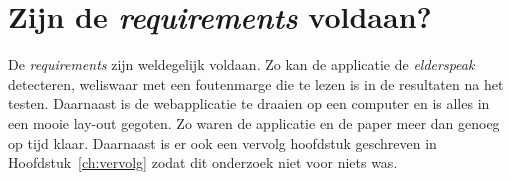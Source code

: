 \section{Zijn de \textit{requirements} voldaan?}
De \textit{requirements} zijn weldegelijk voldaan. Zo kan de applicatie de \textit{elderspeak} detecteren, weliswaar met een foutenmarge die te lezen is in de resultaten na het testen.
Daarnaast is de webapplicatie te draaien op een computer en is alles in een mooie lay-out gegoten.
Zo waren de applicatie en de paper meer dan genoeg op tijd klaar. Daarnaast is er ook een vervolg hoofdstuk geschreven in Hoofdstuk~\ref{ch:vervolg} zodat dit onderzoek niet voor niets was.
